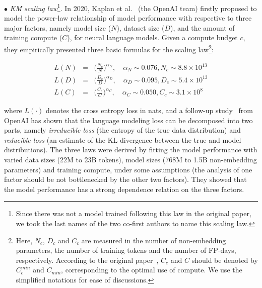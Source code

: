 $\bullet$ \emph{KM scaling law}\footnote{Since there was not a model trained following this law in the original paper, we took the last names of the two co-first authors to name this scaling law. 
}. In 2020, Kaplan et al.~\cite{Kaplan-arxiv-2020-Scaling} (the OpenAI team) firstly proposed to model the power-law relationship of model performance with respective to three major factors, namely model size ($N$), dataset size ($D$), and the amount of training compute ($C$), for neural language models. Given a compute budget $c$, they empirically presented three basic formulas for the scaling law\footnote{Here, $N_c$, $D_c$ and $C_c$ are measured in the number of non-embedding parameters, the number of training tokens and the number of FP-days, respectively. According to the original paper~\cite{Kaplan-arxiv-2020-Scaling}, $C_c$ and $C$ should be denoted by $C_c^{min}$ and $C_{min}$, corresponding to the optimal use of compute. We use the simplified notations for ease of discussions. }: 

\begin{small}
\begin{eqnarray}
L(N) &=& \bigg(\frac{N_c}{N}\bigg)^{\alpha_N}, \text{~~~} \alpha_N \sim 0.076, N_c \sim 8.8\times 10^{13} \\\nonumber
L(D) &=& \bigg(\frac{D_c
}{D}\bigg)^{\alpha_D},  \text{~~~} \alpha_D \sim 0.095, D_c \sim 5.4\times 10^{13} \\\nonumber
L(C) &=& \bigg(\frac{C_c}{C}\bigg)^{\alpha_C},  \text{~~~} \alpha_C \sim 0.050, C_c \sim 3.1\times 10^{8}\nonumber
\end{eqnarray}
\end{small}

\noindent where $L(\cdot)$ denotes  the cross entropy loss in nats, and a follow-up study~\cite{Henighan-2020-scalinglaw} from OpenAI has shown that the language modeling loss can be decomposed into two parts, namely \emph{irreducible loss} (the entropy of the true data distribution) and \emph{reducible loss} (an estimate of the KL divergence between the true and model distributions). The three laws were derived by fitting the model performance with varied data sizes (22M to 23B tokens), model sizes  (768M to 1.5B non-embedding parameters) and training compute, under some assumptions (\eg the analysis of one factor should be not bottlenecked by the other two factors). They showed that the model performance has a strong dependence relation on the three factors. 

